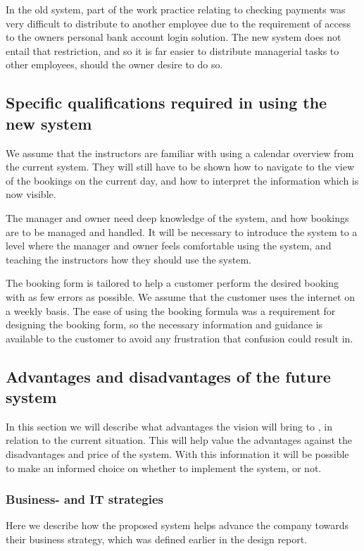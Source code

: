 In the old system, part of the work practice relating to checking payments 
was very difficult to distribute to another employee due to the requirement
of access to the owners personal bank account login solution. The new system
does not entail that restriction, and so it is far easier to distribute managerial
tasks to other employees, should the owner desire to do so.

\subsection{Specific qualifications required in using the new system}
We assume that the instructors are familiar with using a calendar overview from 
the current system. They will 
still have to be shown how to navigate to the view of the bookings on the 
current day, and how to interpret the information which is now visible.

The manager and owner need deep knowledge of the system, and how bookings are to 
be managed and handled. It will be necessary to introduce the system to a level
where the manager and owner feels comfortable using the system, and teaching 
the instructors how they should use the system.

The booking form is tailored to help a customer perform the desired booking with 
as few errors as possible. We assume that the customer uses the internet on a 
weekly basis. The ease of using the booking formula was a 
requirement for designing the booking form, so the necessary information and
guidance is available to the customer to avoid any frustration that confusion
could result in.

\subsection{Advantages and disadvantages of the future system}
In this section we will describe what advantages the vision will bring to 
\gomonkey, in relation to the current situation. This will help value the advantages against the disadvantages and
price of the system. With this information it will be possible to make an informed
choice on whether to implement the system, or not.

\subsubsection{Business- and IT strategies}
Here we describe how the proposed system helps advance the company towards their 
business strategy, which was defined earlier in the design report. 

